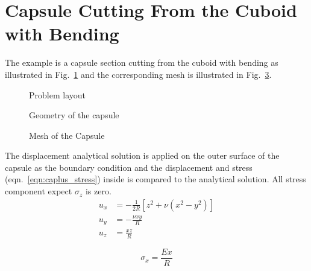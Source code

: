 \section{Capsule Cutting From the Cuboid with Bending}
The example is a capsule section cutting from the cuboid with bending as illustrated in Fig.~\ref{oct_fig:ex_caplus_layout} and the corresponding mesh is illustrated in Fig.~\ref{oct_fig:ex_caplus_mesh1.png}.
\begin{figure}[h!]
  \centering
  \caption{Problem layout}
  \label{oct_fig:ex_caplus_layout}
\end{figure}

\begin{figure}[h!]
  \centering
  \caption{Geometry of the capsule}
  \label{oct_fig:ex_caplus_geo}
\end{figure}


\begin{figure}[h!]
    \centering
    \begin{subfigure}[b]{1\linewidth}
        \centering
    \end{subfigure}
    \begin{subfigure}[b]{1\linewidth}
        \centering
    \end{subfigure}
    \caption{Mesh of the Capsule}
    \label{oct_fig:ex_caplus_mesh1.png}
\end{figure}

The displacement analytical solution \cite{Tim1951} is applied on the outer surface of the capsule as the boundary condition and the displacement and stress (eqn.~\ref{eqn:caplus_stress}) inside is compared to the analytical solution. All stress component expect $\sigma_z$ is zero.
\begin{subequations}
\begin{align}
  u_x &= -\frac{1}{2R}\left[z^2 + \nu \left(x^2 - y^2 \right)\right]\\
  u_y &= -\frac{\nu xy}{R}\\
  u_z &= \frac{xz}{R} 
  \label{eqn:capluse_displacement}
\end{align}
\end{subequations}

\begin{equation}
  \sigma_x = \frac{Ex}{R}
  \label{eqn:caplus_stress}
\end{equation}

